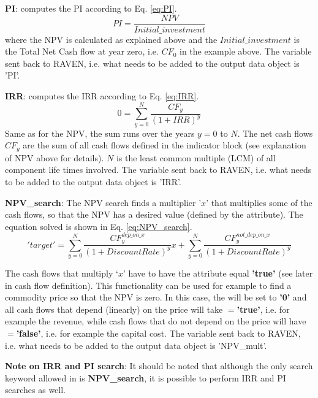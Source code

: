 \begin{enumerate}
\begin{enumerate}
\textbf{PI}: computes the PI according to Eq. \ref{eq:PI}.
\begin{equation}\label{eq:PI}
PI=\frac{NPV}{Initial\_investment}
\end{equation}
where the NPV is calculated as explained above and the $Initial\_investment$ is the Total Net Cash flow at year zero, i.e. $CF_{0}$ in the example above.
The variable sent back to RAVEN, i.e. what needs to be added to the output data object is 'PI'.

\textbf{IRR}: computes the IRR according to Eq. \ref{eq:IRR}.
\begin{equation}\label{eq:IRR}
0=\sum_{y=0}^{N}\frac{CF_{y}}{(1+IRR)^{y}}
\end{equation}
Same as for the NPV, the sum runs over the years $y=0$ to $N$. The net cash flows $CF_{y}$ are the sum of all cash flows defined in the indicator block
(see explanation of NPV above for details). $N$ is the least common multiple (LCM) of all component life times involved.
The variable sent back to RAVEN, i.e. what needs to be added to the output data object is 'IRR'.

\textbf{NPV\_search}: The NPV search finds a multiplier '$x$' that multiplies some of the cash flows, so that the NPV has a desired value (defined by the  attribute). The equation solved is shown in Eq. \ref{eq:NPV_search}.
\label{subsec:NPV_search}
\begin{equation}\label{eq:NPV_search}
'target'=\sum_{y=0}^{N}\frac{CF^{dep\_on\_x}_{y}}{(1+DiscountRate)^{y}}x + \sum_{y=0}^{N}\frac{CF^{not\_dep\_on\_x}_{y}}{(1+DiscountRate)^{y}}
\end{equation}

The cash flows that multiply ‘$x$’ have to have the  attribute equal \textbf{'true'} (see later in cash flow definition). This functionality can be used for
 example to find a commodity price so that the NPV is zero. In this case, the  will be set to \textbf{'0'} and all cash flows that depend (linearly) on the price will take
 $=$\textbf{'true'}, i.e. for example the revenue, while cash flows that do not depend on the price will have $=$\textbf{'false'}, i.e. for example the capital cost.
The variable sent back to RAVEN, i.e. what needs to be added to the output data object is 'NPV\_mult'.

\textbf{Note on IRR and PI search}: It should be noted that although the only search keyword allowed in  is \textbf{NPV\_search}, it is possible to perform IRR and PI searches as well.


\end{enumerate}
\end{enumerate}
